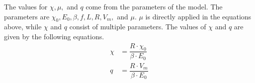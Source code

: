 
The values for $\chi, \mu,$ and $q$ come from the parameters of the model.
The parameters are $\chi_0, E_0, \beta, f, L, R, V_m,$ and $\mu$.
$\mu$ is directly applied in the equations above, while $\chi$ and $q$ consist of multiple parameters.
The values of $\chi$ and $q$ are given by the following equations.
\begin{align}
    \chi & = \dfrac{R \cdot \chi_0}{\beta \cdot E_0} \\
    q & = \dfrac{R \cdot V_m}{\beta \cdot E_0}
\end{align}
